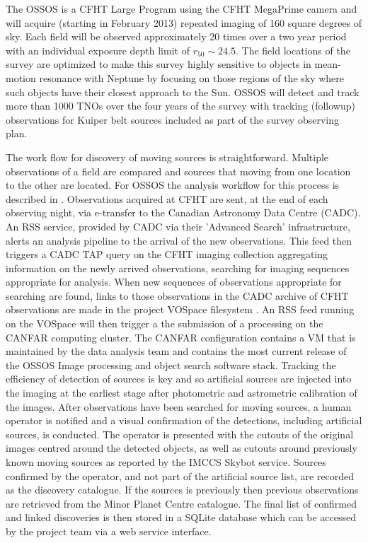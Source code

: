 The OSSOS is a CFHT Large Program using the CFHT MegaPrime camera and will acquire (starting in February 2013) repeated imaging of 160 square degrees of sky.  
Each field will be observed approximately 20 times over a two year period with an individual exposure depth limit of $r_{50} \sim 24.5$.  
The field locations  of the survey are optimized to make this survey highly sensitive to objects in mean-motion resonance with Neptune by focusing on those regions of the sky where such objects have their closest approach to the Sun.   
OSSOS will detect and track more than 1000 TNOs over the four years of the survey with tracking (followup) observations for Kuiper belt sources included as part of the survey observing plan.

The work flow for discovery of moving sources is straightforward.  
Multiple observations of a field are compared and sources that moving from one location to the other are located. 
For OSSOS the analysis workflow for this process is described in \citep{2004MNRAS.347..471P}. 
Observations acquired at CFHT are sent, at the end of each observing night, via e-transfer to the Canadian Astronomy Data Centre (CADC).   
An RSS service, provided by CADC via their 'Advanced Search' infrastructure, alerts an analysis pipeline to the arrival of the new observations.  
This feed then triggers a CADC TAP query on the CFHT imaging collection aggregating information on the newly arrived observations, searching for imaging sequences appropriate for analysis.  
When new sequences of observations appropriate for searching are found, links to those observations in the CADC archive of CFHT observations are made in the project VOSpace filesystem \citep{2012ASPC..461..367K}.
An RSS feed running on the VOSpace will then trigger a the submission of a processing on the CANFAR \citep{2009ASPC..411..185G} computing cluster.   
The CANFAR configuration contains a VM that is maintained by the data analysis team and contains the most current release of the OSSOS Image processing and object search software stack.
Tracking the efficiency of detection of sources is key and so artificial sources are injected into the imaging at the earliest stage after photometric and astrometric calibration of the images. 
After observations have been searched for moving sources, a human operator  is notified and a visual confirmation of the detections, including artificial sources, is conducted.  
The operator is presented with the cutouts of the original images centred around the detected objects, as well as cutouts around previously known moving sources as reported by the IMCCS Skybot \citep{2006ASPC..351..367B} service.
Sources  confirmed by the operator, and not part of the artificial source list, are recorded as the discovery catalogue.  
If the sources is previously then previous observations are retrieved from the Minor Planet Centre catalogue.
The final list of confirmed and linked discoveries is then stored in a SQLite database which can be accessed by the project team via a web service interface. 



